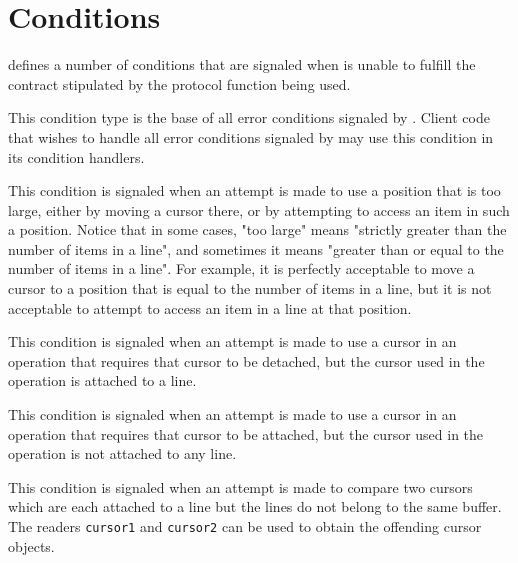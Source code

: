 \section{Conditions}

\sysname{} defines a number of conditions that are signaled when
\sysname{} is unable to fulfill the contract stipulated by the
protocol function being used.


This condition type is the base of all error conditions signaled by
\sysname{}.  Client code that wishes to handle all error conditions
signaled by \sysname{} may use this condition in its condition
handlers.


This condition is signaled when an attempt is made to use a
position that is too large, either by moving a cursor there, or by
attempting to access an item in such a position.  Notice that in
some cases, "too large" means "strictly greater than the number of
items in a line", and sometimes it means "greater than or equal to
the number of items in a line".  For example, it is perfectly
acceptable to move a cursor to a position that is equal to the
number of items in a line, but it is not acceptable to attempt to
access an item in a line at that position.




This condition is signaled when an attempt is made to use a cursor
in an operation that requires that cursor to be detached, but the
cursor used in the operation is attached to a line.


This condition is signaled when an attempt is made to use a cursor
in an operation that requires that cursor to be attached, but the
cursor used in the operation is not attached to any line.


This condition is signaled when an attempt is made to compare two
cursors which are each attached to a line but the lines do not belong
to the same buffer.  The readers \texttt{cursor1} and \texttt{cursor2}
can be used to obtain the offending cursor objects.

